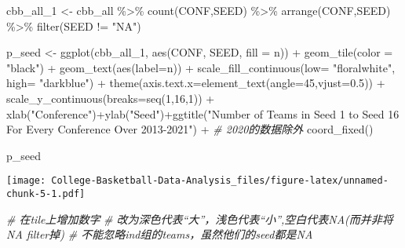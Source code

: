 \documentclass[
]{article}
\newenvironment{Shaded}{\begin{snugshade}}{\end{snugshade}}
\newcommand{\AttributeTok}[1]{\textcolor[rgb]{0.77,0.63,0.00}{#1}}
\newcommand{\CommentTok}[1]{\textcolor[rgb]{0.56,0.35,0.01}{\textit{#1}}}
\newcommand{\DecValTok}[1]{\textcolor[rgb]{0.00,0.00,0.81}{#1}}
\newcommand{\FloatTok}[1]{\textcolor[rgb]{0.00,0.00,0.81}{#1}}
\newcommand{\FunctionTok}[1]{\textcolor[rgb]{0.00,0.00,0.00}{#1}}
\newcommand{\NormalTok}[1]{#1}
\newcommand{\OtherTok}[1]{\textcolor[rgb]{0.56,0.35,0.01}{#1}}
\newcommand{\SpecialCharTok}[1]{\textcolor[rgb]{0.00,0.00,0.00}{#1}}
\newcommand{\StringTok}[1]{\textcolor[rgb]{0.31,0.60,0.02}{#1}}
\begin{document}
\begin{Shaded}
\begin{Highlighting}[]
\NormalTok{cbb\_all\_1 }\OtherTok{\textless{}{-}}\NormalTok{ cbb\_all }\SpecialCharTok{\%\textgreater{}\%} 
  \FunctionTok{count}\NormalTok{(CONF,SEED) }\SpecialCharTok{\%\textgreater{}\%} 
  \FunctionTok{arrange}\NormalTok{(CONF,SEED) }\SpecialCharTok{\%\textgreater{}\%}  
  \FunctionTok{filter}\NormalTok{(SEED }\SpecialCharTok{!=} \StringTok{"NA"}\NormalTok{)}

\NormalTok{p\_seed }\OtherTok{\textless{}{-}} \FunctionTok{ggplot}\NormalTok{(cbb\_all\_1, }\FunctionTok{aes}\NormalTok{(CONF, SEED, }\AttributeTok{fill =}\NormalTok{ n)) }\SpecialCharTok{+}
  \FunctionTok{geom\_tile}\NormalTok{(}\AttributeTok{color =} \StringTok{"black"}\NormalTok{) }\SpecialCharTok{+}
  \FunctionTok{geom\_text}\NormalTok{(}\FunctionTok{aes}\NormalTok{(}\AttributeTok{label=}\NormalTok{n)) }\SpecialCharTok{+}
  \FunctionTok{scale\_fill\_continuous}\NormalTok{(}\AttributeTok{low=} \StringTok{"floralwhite"}\NormalTok{, }\AttributeTok{high=} \StringTok{"darkblue"}\NormalTok{) }\SpecialCharTok{+}
  \FunctionTok{theme}\NormalTok{(}\AttributeTok{axis.text.x=}\FunctionTok{element\_text}\NormalTok{(}\AttributeTok{angle=}\DecValTok{45}\NormalTok{,}\AttributeTok{vjust=}\FloatTok{0.5}\NormalTok{)) }\SpecialCharTok{+}
  \FunctionTok{scale\_y\_continuous}\NormalTok{(}\AttributeTok{breaks=}\FunctionTok{seq}\NormalTok{(}\DecValTok{1}\NormalTok{,}\DecValTok{16}\NormalTok{,}\DecValTok{1}\NormalTok{)) }\SpecialCharTok{+}
  \FunctionTok{xlab}\NormalTok{(}\StringTok{"Conference"}\NormalTok{)}\SpecialCharTok{+}\FunctionTok{ylab}\NormalTok{(}\StringTok{"Seed"}\NormalTok{)}\SpecialCharTok{+}\FunctionTok{ggtitle}\NormalTok{(}\StringTok{"Number of Teams in Seed 1 to Seed 16 For Every Conference Over 2013{-}2021"}\NormalTok{) }\SpecialCharTok{+} \CommentTok{\# 2020的数据除外}
  \FunctionTok{coord\_fixed}\NormalTok{()}

\NormalTok{p\_seed}
\end{Highlighting}
\end{Shaded}

\texttt{[image: College-Basketball-Data-Analysis\_files/figure-latex/unnamed-chunk-5-1.pdf]}

\begin{Shaded}
\begin{Highlighting}[]
\CommentTok{\# 在tile上增加数字}
\CommentTok{\# 改为深色代表“大”，浅色代表“小”,空白代表NA(而并非将NA filter掉)}
\CommentTok{\# 不能忽略ind组的teams，虽然他们的seed都是NA}
\end{Highlighting}
\end{Shaded}
\end{document}
